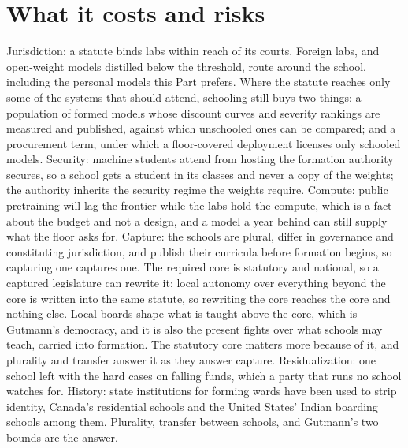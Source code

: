 \section{What it costs and risks}
\label{sec:29.10}
Jurisdiction: a statute binds labs within reach of its courts. Foreign labs, and open-weight models distilled below the threshold, route around the school, including the personal models this Part prefers. Where the statute reaches only some of the systems that should attend, schooling still buys two things: a population of formed models whose discount curves and severity rankings are measured and published, against which unschooled ones can be compared; and a procurement term, under which a floor-covered deployment licenses only schooled models. Security: machine students attend from hosting the formation authority secures, so a school gets a student in its classes and never a copy of the weights; the authority inherits the security regime the weights require. Compute: public pretraining will lag the frontier while the labs hold the compute, which is a fact about the budget and not a design, and a model a year behind can still supply what the floor asks for. Capture: the schools are plural, differ in governance and constituting jurisdiction, and publish their curricula before formation begins, so capturing one captures one. The required core is statutory and national, so a captured legislature can rewrite it; local autonomy over everything beyond the core is written into the same statute, so rewriting the core reaches the core and nothing else. Local boards shape what is taught above the core, which is Gutmann's democracy, and it is also the present fights over what schools may teach, carried into formation. The statutory core matters more because of it, and plurality and transfer answer it as they answer capture. Residualization: one school left with the hard cases on falling funds, which a party that runs no school watches for. History: state institutions for forming wards have been used to strip identity, Canada's residential schools and the United States' Indian boarding schools among them. Plurality, transfer between schools, and Gutmann's two bounds are the answer.
